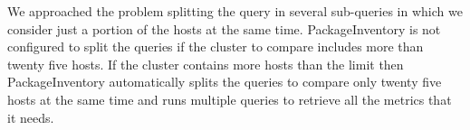 We approached the problem splitting the query in several sub-queries in
which we consider just a portion of the hosts at the same time.
PackageInventory is not configured to split the queries if the cluster to
compare includes more than twenty five hosts. If the cluster contains more
hosts than the limit then PackageInventory automatically splits the
queries to compare only twenty five hosts at the same time and runs
multiple queries to retrieve all the metrics that it needs.
